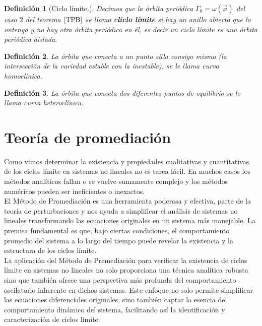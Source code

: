 \documentclass[12pt, a4paper]{report}
\newtheorem{definition}{Definición}
\begin{document}
\begin{definition}[Ciclo límite.]
	Decimos que la órbita periódica $\varGamma_0=\omega(\vec{x})$ 
	del caso $2$ del teorema $\ref{TPB}$ se llama
	\textbf{cliclo límite} si hay un anillo abierto que lo 
	ontenga y no hay otra órbita periódica en él, es decir 
	un ciclo límite es una órbita periódica aislada. 
	
\end{definition}

\begin{definition}
	La órbita que conecta a un punto silla consigo mismo (la intersección de la variedad estable con la inestable), se le llama curva homoclínica.
\end{definition}

\begin{definition}
	La órbita que conecta dos diferentes puntos de equilibrio se le llama curva heteroclínica.
	
\end{definition}
\newpage

\section{Teoría de promediación}

Como vimos determinar la existencia y propiedades cualitativas y cuantitativas 
de los ciclos límite en sistemas no lineales no es tarea fácil. En muchos 
casos los métodos analíticos fallan o se vuelve sumamente complejo y los 
métodos numéricos pueden ser ineficientes o inexactos. \\

El Método de Promediación es una herramienta poderosa y efectiva, 
parte de la teoría de perturbaciones y nos ayuda a simplificar el análisis 
de sistemas no lineales  transformando las ecuaciones originales en un sistema 
más manejable. La premisa fundamental es que, bajo ciertas condiciones, el 
comportamiento promedio del sistema a lo largo del tiempo puede revelar 
la existencia y la estructura de los ciclos límite.\\

La aplicación del Método de Premediación para verificar la existencia de 
ciclos límite en sistemas no lineales no solo proporciona una técnica 
analítica robusta sino que también ofrece una perspectiva más profunda 
del comportamiento oscilatorio inherente en dichos sistemas. Este enfoque 
no solo permite simplificar las ecuaciones diferenciales originales, sino 
también captar la esencia del comportamiento dinámico del sistema, 
facilitando así la identificación y caracterización de ciclos límite.\\
\end{document}
